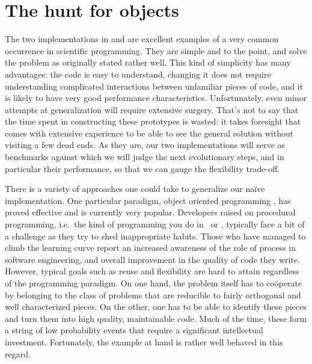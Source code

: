 %
%

\section{The hunt for objects}
\label{sec:classes}

The two implementations in  and  are excellent examples
of a very common occurrence in scientific programming. They are simple and to the point, and
solve the problem as originally stated rather well.  This kind of simplicity has many
advantages: the code is easy to understand, changing it does not require understanding
complicated interactions between unfamiliar pieces of code, and it is likely to have very good
performance characteristics. Unfortunately, even minor attempts at generalization will require
extensive surgery. That's not to say that the time spent in constructing these prototypes is
wasted: it takes foresight that comes with extensive experience to be able to see the general
solution without visiting a few dead ends. As they are, our two implementations will serve as
benchmarks against which we will judge the next evolutionary steps, and in particular their
performance, so that we can gauge the flexibility trade-off.

There is a variety of approaches one could take to generalize our na\"ive implementation. One
particular paradigm, object oriented programming \cite{meyer-97}, has proved effective and is
currently very popular. Developers raised on procedural programming, i.e.~the kind of
programming you do in \cc\ or \fortran, typically face a bit of a challenge as they try to shed
inappropriate habits. Those who have managed to climb the learning curve report an increased
awareness of the role of process in software engineering, and overall improvement in the
quality of code they write. However, typical goals such as reuse and flexibility are hard to
attain regardless of the programming paradigm. On one hand, the problem itself has to
co\"operate by belonging to the class of problems that are reducible to fairly orthogonal and
well characterized pieces. On the other, one has to be able to identify these pieces and turn
them into high quality, maintainable code. Much of the time, these form a string of low
probability events that require a significant intellectual investment. Fortunately, the example
at hand is rather well behaved in this regard.


